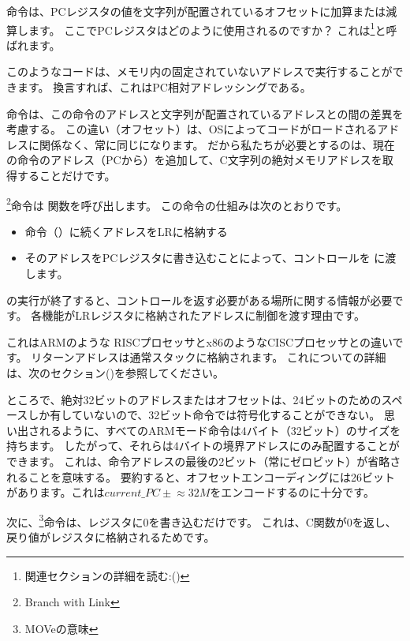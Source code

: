 \myindex{\PICcode}
命令は、\ac{PC}レジスタの値を文字列が配置されているオフセットに加算または減算します。 
ここでPCレジスタはどのように使用されるのですか？ これは\q{\PICcode}\footnote{関連セクションの詳細を読む:()}と呼ばれます。

このようなコードは、メモリ内の固定されていないアドレスで実行することができます。 換言すれば、これは\ac{PC}相対アドレッシングである。

命令は、この命令のアドレスと文字列が配置されているアドレスとの間の差異を考慮する。 
この違い（オフセット）は、\ac{OS}によってコードがロードされるアドレスに関係なく、常に同じになります。 
だから私たちが必要とするのは、現在の命令のアドレス（\ac{PC}から）を追加して、C文字列の絶対メモリアドレスを取得することだけです。

\footnote{Branch with Link}命令は \printf 関数を呼び出します。 
この命令の仕組みは次のとおりです。

\begin{itemize}
\item {}命令（）に続くアドレスを\ac{LR}に格納する
\item そのアドレスを\ac{PC}レジスタに書き込むことによって、コントロールを \printf に渡します。
\end{itemize}

\printf の実行が終了すると、コントロールを返す必要がある場所に関する情報が必要です。
各機能が\ac{LR}レジスタに格納されたアドレスに制御を渡す理由です。

これはARMのような \ac{RISC}プロセッサとx86のような\ac{CISC}プロセッサとの違いです。
リターンアドレスは通常スタックに格納されます。
これについての詳細は、次のセクション()を参照してください。

ところで、絶対32ビットのアドレスまたはオフセットは、24ビットのためのスペースしか有していないので、32ビット命令では符号化することができない。
思い出されるように、すべてのARMモード命令は4バイト（32ビット）のサイズを持ちます。
したがって、それらは4バイトの境界アドレスにのみ配置することができます。
これは、命令アドレスの最後の2ビット（常にゼロビット）が省略されることを意味する。
要約すると、オフセットエンコーディングには26ビットがあります。これは$current\_PC \pm{} \approx{}32M$をエンコードするのに十分です。

次に、\footnote{MOVeの意味}命令は、レジスタに0を書き込むだけです。
これは、C関数が0を返し、戻り値がレジスタに格納されるためです。

